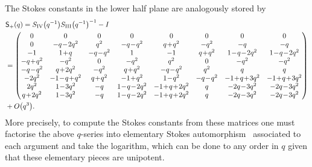 \documentclass[pdftex]{sigma}
\numberwithin{equation}{section}
\begin{document}
The Stokes constants in the lower half plane are analogously stored by{\setlength{\arraycolsep}{1.5pt}
\begin{align*}
 &\mathsf{S}_{+}(q) =S_{\rm IV}\bigl(q^{-1}\bigr)S_{\rm III}\bigl(q^{-1}\bigr)^{-1}-I\\
 &
 =\begin{pmatrix}
 0 & 0 & 0 & 0 & 0 & 0 & 0 & 0\\
 0 & -q\!-\!2q^2 & q^2 & -q\!-\!q^2 & q\!+\!q^2 & -q^2 & -q & -q\\
 -1 & 1\!+\!q & -q\!-\!q^2 & 1 & -1 & q\!+\!q^2 & 1\!-\!q\!-\!2q^2 & 1\!-\!q\!-\!2q^2\\
 -q\!+\!q^2 & -q^2 & 0 & -q^2 & q^2 & 0 & -q^2 & -q^2\\
 -q\!-\!q^2 & q\!+\!2q^2 & -q^2 & q\!+\!q^2 & -q\!-\!q^2 & q^2 & q & q\\
 -2q^2 & -1\!-\!q\!+\!q^2 & q\!+\!q^2 & -1\!+\!q^2 & 1\!-\!q^2 & -q\!-\!q^2 & -1\!+\!q\!+\!3q^2 & -1\!+\!q\!+\!3q^2\\
 2q^2 & 1\!-\!3q^2 & -q & 1\!-\!q\!-\!2q^2 & -1\!+\!q\!+\!2q^2 & q & -2q\!-\!3q^2 & -2q\!-\!3q^2\\
 q\!+\!2q^2 & 1\!-\!3q^2 & -q & 1\!-\!q\!-\!2q^2 & -1\!+\!q\!+\!2q^2 & q & -2q\!-\!3q^2 & -2q\!-\!3q^2
 \end{pmatrix}\\
 &  +O\bigl(q^3\bigr) .
\end{align*}}%
More precisely, to compute the Stokes constants from these matrices one must factorise the above $q$-series into elementary Stokes automorphism~\cite[equations~(66)--(68)]{GGM:I} associated to each argument and take the logarithm, which can be done to any order in $q$ given that these elementary pieces are unipotent.
\end{document}
